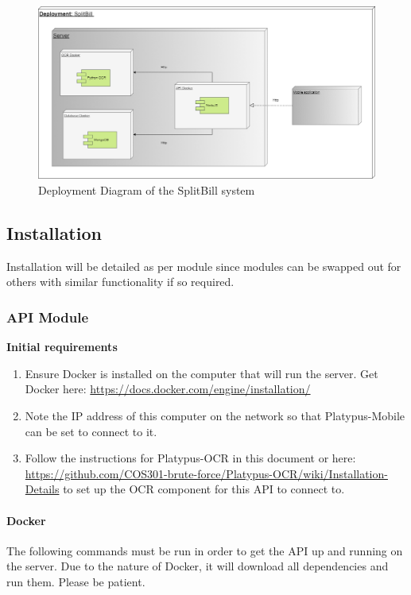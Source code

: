 \documentclass[12pt,a4paper]{article}
\begin{document}
\begin{figure}[h]
\includegraphics[width= \textwidth]{Deployment.png}
\caption{Deployment Diagram of the SplitBill system}
\centering
\end{figure}
       
    \subsection{Installation}
    Installation will be detailed as per module since modules can be swapped out for others with similar functionality if so required. 
    \subsubsection{API Module}
    \textbf{Initial requirements}
     	\begin{enumerate}
     	\item Ensure Docker is installed on the computer that will run the server. Get Docker here: \url{https://docs.docker.com/engine/installation/} 
        
        \item Note the IP address of this computer on the network so that Platypus-Mobile can be set to connect to it.
        
        \item Follow the instructions for Platypus-OCR in this document or  here: \url{https://github.com/COS301-brute-force/Platypus-OCR/wiki/Installation-Details} to set up the OCR component for this API to connect to.
     	\end{enumerate}
        
	\paragraph{Docker}
	The following commands must be run in order to get the API up and running on the server. Due to the nature of Docker, it will download all dependencies and run them. Please be patient.
    \vspace{1cm}
 
\end{document}
